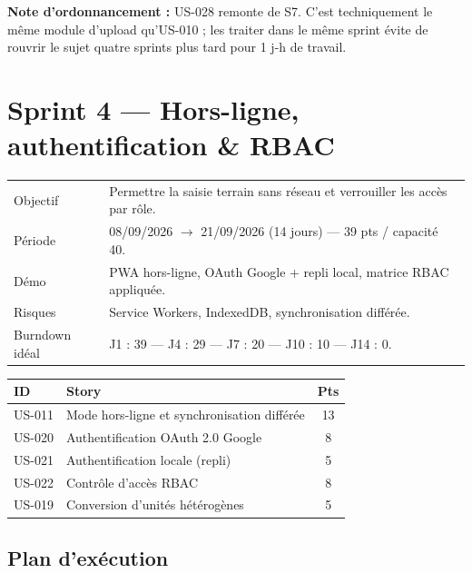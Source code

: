 \textbf{Note d'ordonnancement :} US-028 remonte de S7. C'est techniquement
le même module d'upload qu'US-010 ; les traiter dans le même sprint évite
de rouvrir le sujet quatre sprints plus tard pour 1 j-h de travail.

\section{Sprint 4 --- Hors-ligne, authentification \& RBAC}

\begin{center}
\begin{tabular}{lp{11cm}}
\toprule
Objectif  & Permettre la saisie terrain sans réseau et verrouiller les
            accès par rôle. \\
Période   & 08/09/2026 $\rightarrow$ 21/09/2026 (14 jours) --- 39 pts / capacité 40. \\
Démo      & PWA hors-ligne, OAuth Google + repli local, matrice RBAC
            appliquée. \\
Risques   & Service Workers, IndexedDB, synchronisation différée. \\
Burndown idéal & J1 : 39 --- J4 : 29 --- J7 : 20 --- J10 : 10 --- J14 : 0. \\
\bottomrule
\end{tabular}
\end{center}

\begin{center}
\begin{tabular}{lp{9cm}c}
\toprule
\textbf{ID} & \textbf{Story} & \textbf{Pts} \\
\midrule
US-011 & Mode hors-ligne et synchronisation différée & 13 \\
US-020 & Authentification OAuth 2.0 Google           & 8 \\
US-021 & Authentification locale (repli)             & 5 \\
US-022 & Contrôle d'accès RBAC                       & 8 \\
US-019 & Conversion d'unités hétérogènes             & 5 \\
\bottomrule
\end{tabular}
\end{center}

\subsection{Plan d'exécution}

